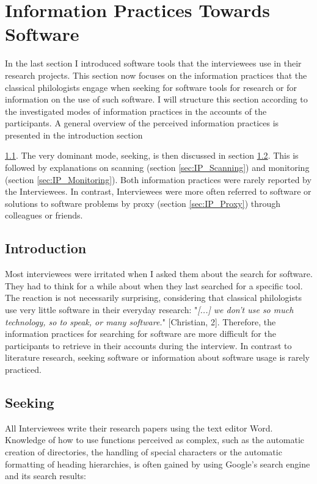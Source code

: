 \documentclass[12pt, a4paper, titlepage, oneside, abstract=true, toc=listof, toc=bibliography]{scrreprt}
\begin{document}
\section{Information Practices Towards Software}
\label{sec:IP_SW}
In the last section I introduced software tools that the interviewees use in their research projects. This section now focuses on the information practices that the classical philologists engage when seeking for software tools for research or for information on the use of such software. I will structure this section according to the investigated modes of information practices in the accounts of the participants. A general overview of the perceived information practices is presented in the introduction section {\ref{sec:IP_Introduction}. The very dominant mode, seeking, is then discussed in section \ref{sec:IP_Seeking}. This is followed by explanations on scanning (section \ref{sec:IP_Scanning}) and monitoring (section \ref{sec:IP_Monitoring}). Both information practices were rarely reported by the Interviewees. In contrast, Interviewees were more often referred to software or solutions to software problems by proxy (section \ref{sec:IP_Proxy}) through colleagues or friends.

\subsection{Introduction}
\label{sec:IP_Introduction}
Most interviewees were irritated when I asked them about the search for software. They had to think for a while about when they last searched for a specific tool. The reaction is not necessarily surprising, considering that classical philologists use very little software in their everyday research: "\textit{[...] we don't use so much technology, so to speak, or many software.}" [Christian, 2]. Therefore, the information practices for searching for software are more difficult for the participants to retrieve in their accounts during the interview. In contrast to literature research, seeking software or information about software usage is rarely practiced. 

\subsection{Seeking}
\label{sec:IP_Seeking}
All Interviewees write their research papers using the text editor Word. Knowledge of how to use functions perceived as complex, such as the automatic creation of directories, the handling of special characters or the automatic formatting of heading hierarchies, is often gained by using Google's search engine and its search results:

}
\end{document}
